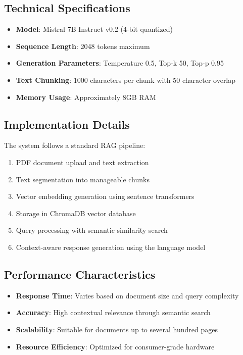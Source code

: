 \subsection{Technical Specifications}
\begin{itemize}
    \item \textbf{Model}: Mistral 7B Instruct v0.2 (4-bit quantized)
    \item \textbf{Sequence Length}: 2048 tokens maximum
    \item \textbf{Generation Parameters}: Temperature 0.5, Top-k 50, Top-p 0.95
    \item \textbf{Text Chunking}: 1000 characters per chunk with 50 character overlap
    \item \textbf{Memory Usage}: Approximately 8GB RAM
\end{itemize}

\subsection{Implementation Details}
The system follows a standard RAG pipeline:
\begin{enumerate}
    \item PDF document upload and text extraction
    \item Text segmentation into manageable chunks
    \item Vector embedding generation using sentence transformers
    \item Storage in ChromaDB vector database
    \item Query processing with semantic similarity search
    \item Context-aware response generation using the language model
\end{enumerate}

\subsection{Performance Characteristics}
\begin{itemize}
    \item \textbf{Response Time}: Varies based on document size and query complexity
    \item \textbf{Accuracy}: High contextual relevance through semantic search
    \item \textbf{Scalability}: Suitable for documents up to several hundred pages
    \item \textbf{Resource Efficiency}: Optimized for consumer-grade hardware
\end{itemize}

